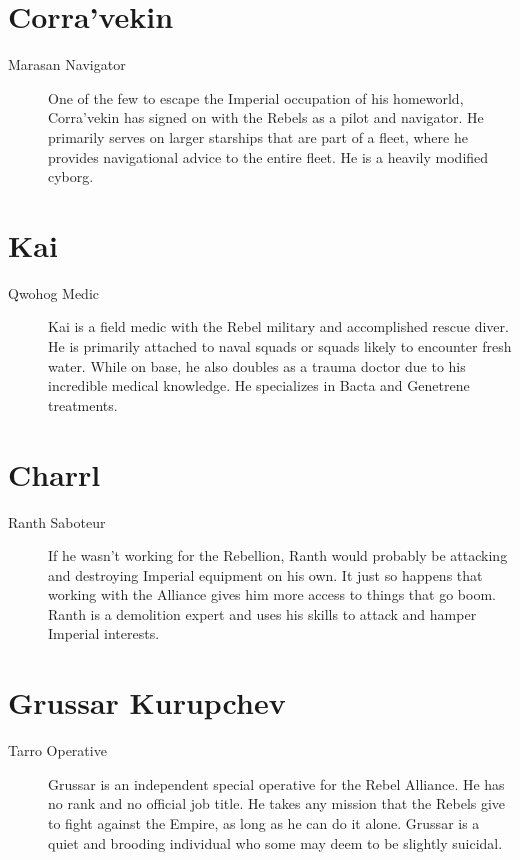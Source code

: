 \documentclass{article}
\begin{document}
\section{Corra’vekin}
\begin{description}
	\item [Marasan \male Navigator] One of the few to escape the Imperial occupation of his homeworld, Corra’vekin has signed on with the Rebels as a pilot and navigator. He primarily serves on larger starships that are part of a fleet, where he provides navigational advice to the entire fleet. He is a heavily modified cyborg.
\end{description}
\section{Kai}
\begin{description}
	\item [Qwohog \male Medic] Kai is a field medic with the Rebel military and accomplished rescue diver. He is primarily attached to naval squads or squads likely to encounter fresh water. While on base, he also doubles as a trauma doctor due to his incredible medical knowledge. He specializes in Bacta and Genetrene treatments.
\end{description}
\section{Charrl}
\begin{description}
	\item [Ranth \male Saboteur] If he wasn’t working for the Rebellion, Ranth would probably be attacking and destroying Imperial equipment on his own. It just so happens that working with the Alliance gives him more access to things that go boom. Ranth is a demolition expert and uses his skills to attack and hamper Imperial interests.
\end{description}
\section{Grussar Kurupchev}
\begin{description}
	\item [Tarro \male Operative] Grussar is an independent special operative for the Rebel Alliance. He has no rank and no official job title. He takes any mission that the Rebels give to fight against the Empire, as long as he can do it alone. Grussar is a quiet and brooding individual who some may deem to be slightly suicidal.
\end{description}
\end{document}
